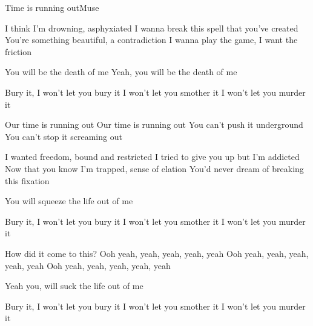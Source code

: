 \begin{Song}{Time is running out}{Muse}
\begin{multicols}{2}

\begin{Verse}
I think I'm drowning, asphyxiated
I wanna break this spell that you've created
You're something beautiful, a contradiction
I wanna play the game, I want the friction
\espaceInterStrophe

You will be the death of me
Yeah, you will be the death of me
\end{Verse}
\espaceInterStrophe

\begin{PreChorus}
Bury it, I won't let you bury it
I won't let you smother it
I won't let you murder it
\end{PreChorus}
\espaceInterStrophe

\begin{Chorus}
Our time is running out
Our time is running out
You can't push it underground
You can't stop it screaming out
\end{Chorus}
\espaceInterStrophe

\begin{Verse}
I wanted freedom, bound and restricted
I tried to give you up but I'm addicted
Now that you know I'm trapped, sense of elation
You'd never dream of breaking this fixation

You will squeeze the life out of me
\end{Verse}
\espaceInterStrophe

\begin{PreChorus}
Bury it, I won't let you bury it
I won't let you smother it
I won't let you murder it
\end{PreChorus}
\espaceInterStrophe

\tochorus
\espaceInterStrophe

\begin{Bridge}
How did it come to this?
Ooh yeah, yeah, yeah, yeah, yeah
Ooh yeah, yeah, yeah, yeah, yeah
Ooh yeah, yeah, yeah, yeah, yeah
\end{Bridge}
\espaceInterStrophe

\begin{Verse}
Yeah you, will suck the life out of me
\end{Verse}
\espaceInterStrophe

\begin{PreChorus}
Bury it, I won't let you bury it
I won't let you smother it
I won't let you murder it
\end{PreChorus}
\espaceInterStrophe


\end{multicols}
\end{Song}
